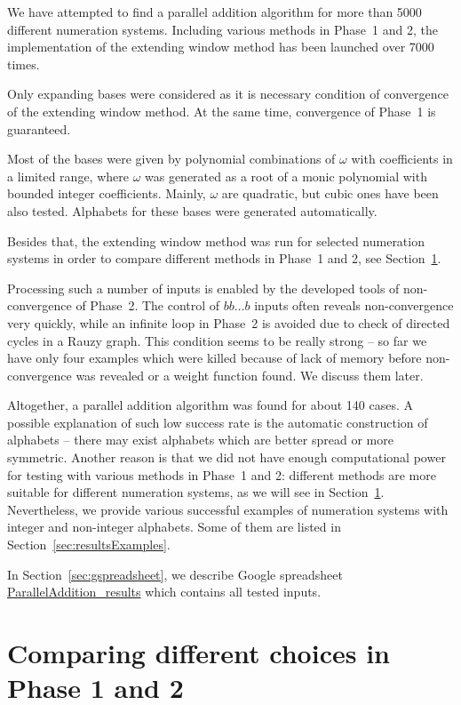 We have attempted to find a parallel addition algorithm for more than 5000 different numeration systems. Including various methods in Phase~1 and 2, the implementation of the extending window method has been launched over 7000 times. 

Only expanding bases were considered as it is  necessary condition of convergence of the extending window method. At the same time, convergence of Phase~1 is guaranteed.

Most of the bases were given by polynomial combinations of $\omega$ with coefficients in a limited range, where $\omega$ was generated as a root of a monic polynomial with bounded integer coefficients. Mainly, $\omega$ are  quadratic, but cubic ones have been also tested. Alphabets for these bases were generated automatically. 

Besides that, the extending window method was run for selected numeration systems in order to compare different methods in Phase~1 and 2, see  Section~\ref{sec:compareMethods}.

Processing such a number of inputs is enabled by the developed tools of non-convergence of Phase~2. The control of $bb\dots b$ inputs often reveals non-convergence very quickly, while an infinite loop in Phase~2 is avoided due to check of directed cycles in a Rauzy graph. This condition seems to be really strong -- so far we have only four examples which were killed because of lack of memory before non-convergence was revealed or a weight function found. We discuss them later.

Altogether, a parallel addition algorithm was found for about 140 cases. A possible explanation of such low success rate is the automatic construction of alphabets -- there may exist  alphabets which are better spread or more symmetric. Another reason is that we did not have enough computational power for testing with various methods in Phase~1 and 2:  different methods are more suitable for different numeration systems, as we will see in Section~\ref{sec:compareMethods}.
Nevertheless, we provide various successful examples of numeration systems with integer and non-integer alphabets. Some of them are listed in Section~\ref{sec:resultsExamples}.

In Section~\ref{sec:gspreadsheet}, we describe Google spreadsheet \href{https://docs.google.com/spreadsheets/d/1TnhrHdefHfHa0WSeVs4q6XVj3epjPlPlnoekE0E1xeM/edit?usp=sharing}{ParallelAddition\_results} which contains all tested inputs.

\section{Comparing different choices in Phase 1 and 2}
\label{sec:compareMethods}

